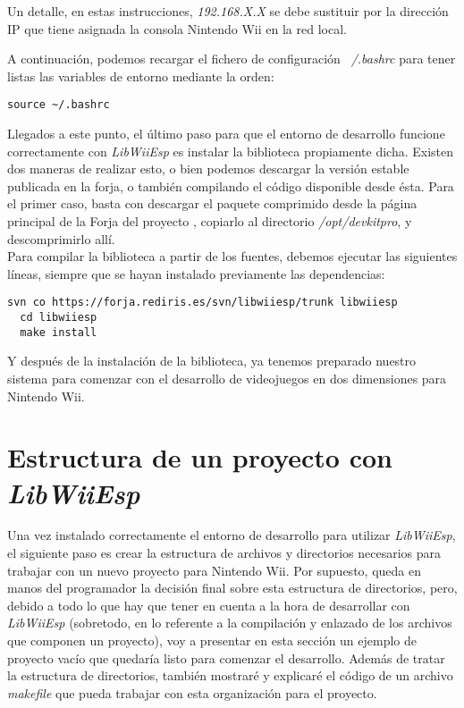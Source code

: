 Un detalle, en estas instrucciones, \emph{192.168.X.X} se debe sustituir por la dirección IP que tiene asignada la consola Nintendo Wii en la red local.

A continuación, podemos recargar el fichero de configuración \emph{~/.bashrc} para tener listas las variables de entorno mediante la orden:

\begin{lstlisting}[style=consola]
  source ~/.bashrc
\end{lstlisting}

Llegados a este punto, el último paso para que el entorno de desarrollo funcione correctamente con \emph{LibWiiEsp} es instalar la biblioteca propiamente dicha. Existen dos maneras de realizar esto, o bien podemos descargar la versión estable publicada en la forja, o también compilando el código disponible desde ésta. Para el primer caso, basta con descargar el paquete comprimido desde la página principal de la Forja del proyecto \cite{website:forja}, copiarlo al directorio \emph{/opt/devkitpro}, y descomprimirlo allí. \\

Para compilar la biblioteca a partir de los fuentes, debemos ejecutar las siguientes líneas, siempre que se hayan instalado previamente las dependencias:

\begin{lstlisting}[style=consola]
  svn co https://forja.rediris.es/svn/libwiiesp/trunk libwiiesp
  cd libwiiesp
  make install
\end{lstlisting}

Y después de la instalación de la biblioteca, ya tenemos preparado nuestro sistema para comenzar con el desarrollo de videojuegos en dos dimensiones para Nintendo Wii.

\section{Estructura de un proyecto con \emph{LibWiiEsp}}

Una vez instalado correctamente el entorno de desarrollo para utilizar \emph{LibWiiEsp}, el siguiente paso es crear la estructura de archivos y directorios necesarios para trabajar con un nuevo proyecto para Nintendo Wii. Por supuesto, queda en manos del programador la decisión final sobre esta estructura de directorios, pero, debido a todo lo que hay que tener en cuenta a la hora de desarrollar con \emph{LibWiiEsp} (sobretodo, en lo referente a la compilación y enlazado de los archivos que componen un proyecto), voy a presentar en esta sección un ejemplo de proyecto vacío que quedaría listo para comenzar el desarrollo. Además de tratar la estructura de directorios, también mostraré y explicaré el código de un archivo \emph{makefile} que pueda trabajar con esta organización para el proyecto.

